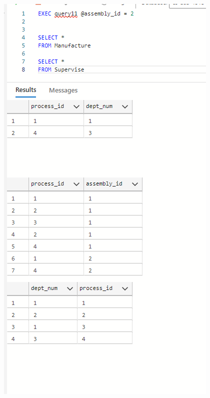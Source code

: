 \documentclass[11pt]{article}
\begin{document}
\begin{enumerate}
\includegraphics[width = \textwidth]{assembly1.png}


\end{enumerate}
\end{document}
